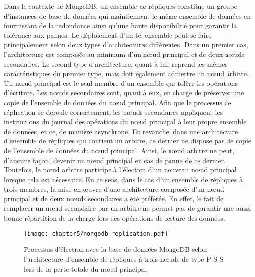 Dans le contexte de MongoDB, un ensemble de répliques constitue un groupe d'instances de base de données qui maintiennent le même ensemble de données en fournissant de la redondance ainsi qu'une haute disponibilité pour garantir la tolérance aux pannes. Le déploiement d'un tel ensemble peut se faire principalement selon deux types d'architectures différentes. Dans un premier cas, l'architecture est composée au minimum d'un n\oe{}ud principal et de deux n\oe{}uds secondaires. Le second type d'architecture, quant à lui, reprend les mêmes caractéristiques du premier type, mais doit également admettre un n\oe{}ud arbitre. Un n\oe{}ud principal est le seul membre d'un ensemble qui tolère les opérations d'écriture. Les n\oe{}uds secondaires sont, quant à eux, en charge de préserver une copie de l'ensemble de données du n\oe{}ud principal. Afin que le processus de réplication se déroule correctement, les n\oe{}uds secondaires appliquent les instructions du journal des opérations du n\oe{}ud principal à leur propre ensemble de données, et ce, de manière asynchrone. En revanche, dans une architecture d'ensemble de répliques qui contient un arbitre, ce dernier ne dispose pas de copie de l'ensemble de données du n\oe{}ud principal. Ainsi, le n\oe{}ud arbitre ne peut, d'aucune façon, devenir un n\oe{}ud principal en cas de panne de ce dernier. Toutefois, le n\oe{}ud arbitre participe à l'élection d'un nouveau n\oe{}ud principal lorsque cela est nécessaire. En ce sens, dans le cas d'un ensemble de répliques à trois membres, la mise en \oe{}uvre d'une architecture composée d'un n\oe{}ud principal et de deux n\oe{}uds secondaires a été préférée. En effet, le fait de remplacer un n\oe{}ud secondaire par un arbitre ne permet pas de garantir une aussi bonne répartition de la charge lors des opérations de lecture des données.

\begin{figure}[hb!]
	\centering
	\texttt{[image: chapter5/mongodb\_replication.pdf]}
        \caption{Processus d'élection avec la base de données MongoDB selon l'architecture d’ensemble de répliques à trois n\oe{}uds de type P-S-S lors de la perte totale du n\oe{}ud principal.}
	\label{fig:mongodb_replication}
\end{figure}

